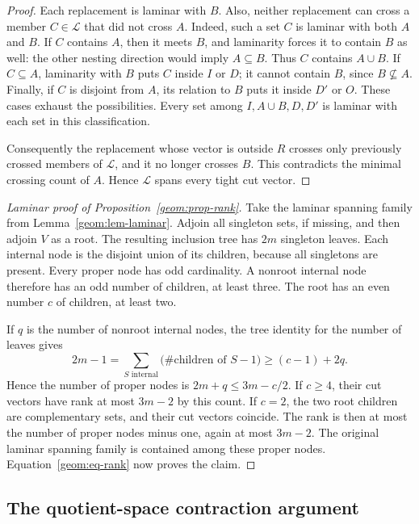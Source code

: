 \begin{proof}
Each replacement is laminar with \(B\). Also, neither replacement
can cross a member \(C\in\mathcal L\) that did not cross \(A\).
Indeed, such a set \(C\) is laminar with both \(A\) and \(B\).
If \(C\) contains \(A\), then it meets \(B\), and laminarity
forces it to contain \(B\) as well: the other nesting direction
would imply \(A\subseteq B\). Thus \(C\) contains \(A\cup B\).
If \(C\subseteq A\), laminarity with \(B\) puts \(C\) inside
\(I\) or \(D\); it cannot contain \(B\), since \(B\nsubseteq A\).
Finally, if \(C\) is disjoint from \(A\), its relation to \(B\)
puts it inside \(D'\) or \(O\). These cases exhaust the
possibilities. Every set among \(I,A\cup B,D,D'\) is laminar with
each set in this classification.

Consequently the replacement whose vector is outside \(R\) crosses
only previously crossed members of \(\mathcal L\), and it no
longer crosses \(B\). This contradicts the minimal crossing count
of \(A\). Hence \(\mathcal L\) spans every tight cut vector.
\end{proof}

\begin{proof}[Laminar proof of Proposition~\ref{geom:prop-rank}]
Take the laminar spanning family from
Lemma~\ref{geom:lem-laminar}. Adjoin all singleton sets, if missing,
and then adjoin \(V\) as a root. The resulting inclusion tree has
\(2m\) singleton leaves. Each internal node is the disjoint union
of its children, because all singletons are present. Every proper
node has odd cardinality. A nonroot internal node therefore has an
odd number of children, at least three. The root has an even number
\(c\) of children, at least two.

If \(q\) is the number of nonroot internal nodes, the tree identity
for the number of leaves gives
\[
 2m-1
 =\sum_{S\text{ internal}}
          \bigl(\#\text{children of }S-1\bigr)
 \ge(c-1)+2q.
\]
Hence the number of proper nodes is
\(2m+q\le3m-c/2\). If \(c\ge4\), their cut vectors have rank at
most \(3m-2\) by this count. If \(c=2\), the two root children
are complementary sets, and their cut vectors coincide. The rank
is then at most the number of proper nodes minus one, again at most
\(3m-2\). The original laminar spanning family is contained among
these proper nodes. Equation~\eqref{geom:eq-rank} now proves the
claim.
\end{proof}

\subsection{The quotient-space contraction argument}

